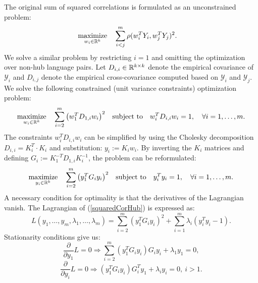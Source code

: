 The original sum of squared correlations is formulated as an unconstrained problem:
\begin{equation*}
  \begin{aligned}
    & \underset{w_i \in \mathbb{R}^{k}}{\text{maximize}}
    & & \sum_{i < j}^m  \rho(w_i^T Y_i, w_j^T Y_j)^2.
\end{aligned}
\end{equation*}
We solve a similar problem by restricting $i=1$ and omitting the optimization over non-hub
language pairs. Let $D_{i,i} \in \mathbb{R}^{k \times k}$ denote the empirical covariance of
$\mathcal{Y}_i$ and $D_{i,j}$ denote the empirical cross-covariance computed based on
$\mathcal{Y}_i$ and $\mathcal{Y}_j$. We solve the following constrained (unit variance
constraints) optimization problem:
\begin{equation}\label{squaredCorHubOriginal}
  \begin{aligned}
    & \underset{w_i \in \mathbb{R}^{k}}{\text{maximize}}
    & & \sum_{i = 2}^m  \left(w_1^T D_{1,i} w_i \right)^2
    & \text{subject to}
    & & w_i^T D_{i,i} w_i = 1, \quad\forall i = 1,\ldots, m.
\end{aligned}
\end{equation}
The constraints $w_i^T D_{i,i} w_i$ can be simplified by using the Cholesky decomposition
$D_{i,i} = K_i^T \cdot K_i$ and substitution: $y_i := K_i w_i$. By inverting the $K_i$
matrices and defining  $G_i := K_1^{-T} D_{1,i} K_i^{-1}$, the problem can be reformulated:
\begin{equation}\label{squaredCorHub}
  \begin{aligned}
    & \underset{y_i \in \mathbb{R}^{k}}{\text{maximize}}
    & & \sum_{i = 2}^m  \left(y_1^T G_{i} y_i \right)^2
    & \text{subject to}
    & & y_i^T y_i = 1, \quad\forall i = 1,\ldots, m.
\end{aligned}
\end{equation}
A necessary condition for optimality is that the derivatives of the Lagrangian vanish.
The Lagrangian of (\ref{squaredCorHub}) is expressed as:
$$  L(y_1, \ldots, y_m, \lambda_1, \ldots, \lambda_m) =
\sum_{i = 2}^m  \left(y_1^T G_{i} y_i \right)^2 + \sum_{i=1}^m \lambda_i \left(y_i^T y_i - 1\right).$$
Stationarity conditions give us:
\begin{equation}\label{dLdx1}
 \frac{\partial}{\partial y_1} L = 0 \Rightarrow
 \sum_{i = 2}^m  \left(y_1^T G_{i} y_i \right) G_i y_i + \lambda_1 y_1 = 0,
\end{equation}
\begin{equation}\label{dLdxi}
\frac{\partial}{\partial y_i} L = 0 \Rightarrow
\left(y_1^T G_{i} y_i \right) G_{i}^T y_1 + \lambda_i y_i = 0,~i > 1.
\end{equation}
